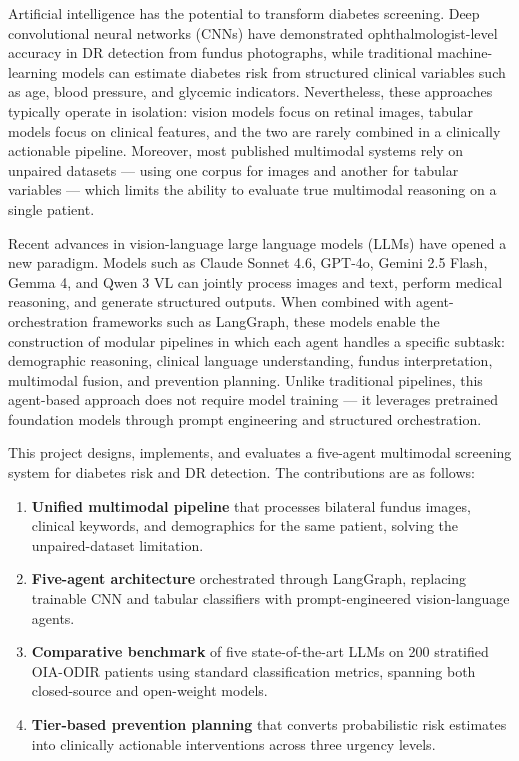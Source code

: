 \documentclass[11pt,a4paper]{article}
\begin{document}
Artificial intelligence has the potential to transform diabetes screening. Deep convolutional neural networks (CNNs) have demonstrated ophthalmologist-level accuracy in DR detection from fundus photographs, while traditional machine-learning models can estimate diabetes risk from structured clinical variables such as age, blood pressure, and glycemic indicators. Nevertheless, these approaches typically operate in isolation: vision models focus on retinal images, tabular models focus on clinical features, and the two are rarely combined in a clinically actionable pipeline. Moreover, most published multimodal systems rely on unpaired datasets --- using one corpus for images and another for tabular variables --- which limits the ability to evaluate true multimodal reasoning on a single patient.

Recent advances in vision-language large language models (LLMs) have opened a new paradigm. Models such as Claude Sonnet 4.6, GPT-4o, Gemini 2.5 Flash, Gemma 4, and Qwen 3 VL can jointly process images and text, perform medical reasoning, and generate structured outputs. When combined with agent-orchestration frameworks such as LangGraph, these models enable the construction of modular pipelines in which each agent handles a specific subtask: demographic reasoning, clinical language understanding, fundus interpretation, multimodal fusion, and prevention planning. Unlike traditional pipelines, this agent-based approach does not require model training --- it leverages pretrained foundation models through prompt engineering and structured orchestration.

This project designs, implements, and evaluates a five-agent multimodal screening system for diabetes risk and DR detection. The contributions are as follows:

\begin{enumerate}
    \item \textbf{Unified multimodal pipeline} that processes bilateral fundus images, clinical keywords, and demographics for the same patient, solving the unpaired-dataset limitation.
    \item \textbf{Five-agent architecture} orchestrated through LangGraph, replacing trainable CNN and tabular classifiers with prompt-engineered vision-language agents.
    \item \textbf{Comparative benchmark} of five state-of-the-art LLMs on 200 stratified OIA-ODIR patients using standard classification metrics, spanning both closed-source and open-weight models.
    \item \textbf{Tier-based prevention planning} that converts probabilistic risk estimates into clinically actionable interventions across three urgency levels.
\end{enumerate}
\end{document}
